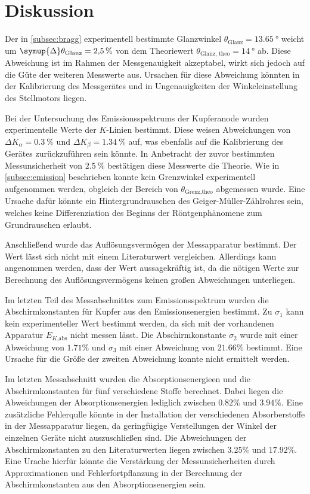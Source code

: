 \section{Diskussion}
\label{sec:Diskussion}
Der in \autoref{subsec:bragg} experimentell bestimmte Glanzwinkel $\theta_\text{Glanz} = \qty{13.65}{\degree}$ weicht um $\symup{\Delta} \theta_\text{Glanz} = \qty{2.5}{\percent}$
von dem Theoriewert $\theta_\text{Glanz, theo} = \qty{14}{\degree}$ ab. Diese Abweichung ist im Rahmen der Messgenauigkeit akzeptabel, wirkt sich jedoch auf die Güte 
der weiteren Messwerte aus. Ursachen für diese Abweichung könnten in der Kalibrierung des Messgerätes und in Ungenauigkeiten der Winkeleinstellung des Stellmotors liegen.

Bei der Untersuchung des Emissionsspektrums der Kupferanode wurden experimentelle Werte der $K$-Linien bestimmt. Diese weisen Abweichungen 
von $\Delta K_{\alpha} = \qty{0.3}{\percent}$ und $\Delta K_{\beta} = \qty{1.34}{\percent}$ auf, was ebenfalls auf die Kalibrierung des Gerätes zurückzuführen sein könnte.
In Anbetracht der zuvor bestimmten Messunsicherheit von $\qty{2.5}{\percent}$ bestätigen diese Messwerte die Theorie.
Wie in \autoref{subsec:emission} beschrieben konnte kein Grenzwinkel experimentell aufgenommen werden, obgleich der Bereich von $\theta_{\text{Grenz,theo}}$
abgemessen wurde. Eine Ursache dafür könnte ein Hintergrundrauschen des Geiger-Müller-Zählrohres sein, welches keine Differenziation des Beginns der Röntgenphänomene 
zum Grundrauschen erlaubt.  

Anschließend wurde das Auflösungsvermögen der Messapparatur bestimmt. Der Wert lässt sich nicht mit einem Literaturwert vergleichen. Allerdings kann angenommen werden, 
dass der Wert aussagekräftig ist, da die nötigen Werte zur Berechnung des Auflösungsvermögens keinen großen Abweichungen unterliegen.

Im letzten Teil des Messabschnittes zum Emissionsspektrum wurden die Abschirmkonstanten für Kupfer aus den Emissionsenergien bestimmt. Zu $\sigma_1$ kann kein experimenteller
Wert bestimmt werden, da sich mit der vorhandenen Apparatur $E_{K \text{,abs}}$ nicht messen lässt.
Die Abschirmkonstante $\sigma_2$ wurde mit einer Abweichung von $1.71\%$ und $\sigma_3$ mit einer Abweichung von $21.66\%$ bestimmt.
Eine Ursache für die Größe der zweiten Abweichung konnte nicht ermittelt werden.

Im letzten Messabschnitt wurden die Absorptionsenergieen und die Abschirmkonstanten für fünf verschiedene Stoffe berechnet. Dabei liegen die Abweichungen der 
Absorptionsenergien lediglich zwischen $0.82\%$ und $3.94\%$. Eine zusätzliche Fehlerqulle könnte in der Installation der verschiedenen Absorberstoffe in der Messapparatur
liegen, da geringfügige Verstellungen der Winkel der einzelnen Geräte nicht auszuschließen sind.
Die Abweichungen der Abschirmkonstanten zu den Literaturwerten liegen zwischen $3.25\%$ und $17.92\%$. Eine Urache hierfür könnte die Verstärkung der Messunsicherheiten 
durch Approximationen und Fehlerfortpflanzung in der Berechnung der Abschirmkonstanten aus den Absorptionsenergien sein.


